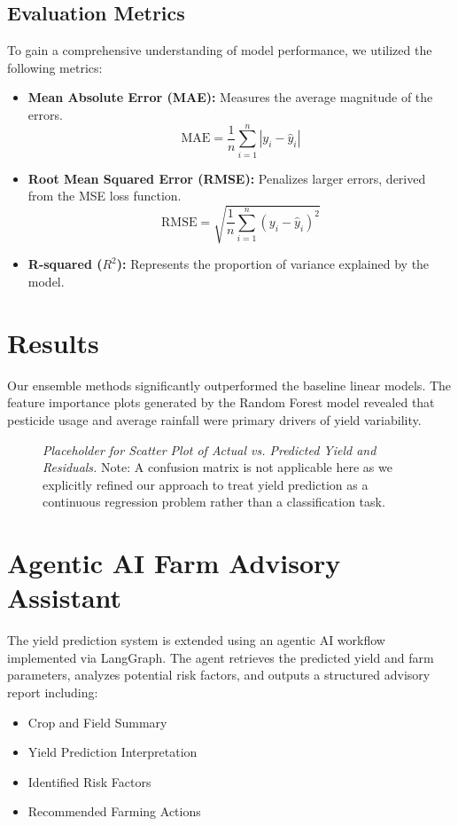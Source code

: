\documentclass[12pt,a4paper]{article}
\begin{document}
\subsection{Evaluation Metrics}
To gain a comprehensive understanding of model performance, we utilized the following metrics:
\begin{itemize}
    \item \textbf{Mean Absolute Error (MAE):} Measures the average magnitude of the errors.
    \begin{equation}
        \text{MAE} = \frac{1}{n} \sum_{i=1}^{n} |y_i - \hat{y}_i|
    \end{equation}
    
    \item \textbf{Root Mean Squared Error (RMSE):} Penalizes larger errors, derived from the MSE loss function.
    \begin{equation}
        \text{RMSE} = \sqrt{\frac{1}{n} \sum_{i=1}^{n} (y_i - \hat{y}_i)^2}
    \end{equation}
    
    \item \textbf{R-squared ($R^2$):} Represents the proportion of variance explained by the model.
\end{itemize}

\section{Results}
Our ensemble methods significantly outperformed the baseline linear models. The feature importance plots generated by the Random Forest model revealed that pesticide usage and average rainfall were primary drivers of yield variability.

\begin{figure}[h!]
    \centering
    \caption{\textit{Placeholder for Scatter Plot of Actual vs. Predicted Yield and Residuals.} Note: A confusion matrix is not applicable here as we explicitly refined our approach to treat yield prediction as a continuous regression problem rather than a classification task.}
    \label{fig:residuals}
\end{figure}

\section{Agentic AI Farm Advisory Assistant}
The yield prediction system is extended using an agentic AI workflow implemented via LangGraph. The agent retrieves the predicted yield and farm parameters, analyzes potential risk factors, and outputs a structured advisory report including:
\begin{itemize}
    \item Crop and Field Summary
    \item Yield Prediction Interpretation
    \item Identified Risk Factors
    \item Recommended Farming Actions
\end{itemize}
\end{document}
